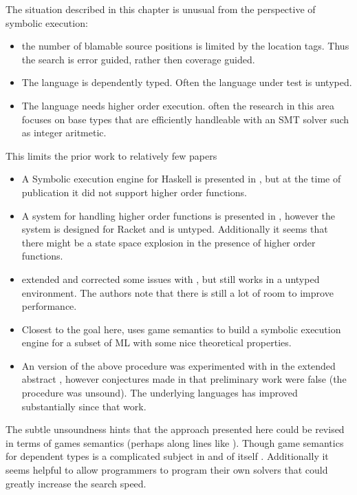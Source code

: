 The situation described in this chapter is unusual from the perspective
of symbolic execution:
\begin{itemize}
\item the number of blamable source positions is limited by the location
tags. Thus the search is error guided, rather then coverage guided.
\item The language is dependently typed. Often the language under test is
untyped.
\item The language needs higher order execution. often the research in this
area focuses on base types that are efficiently handleable with an
SMT solver such as integer aritmetic.
\end{itemize}
This limits the prior work to relatively few papers
\begin{itemize}
\item A Symbolic execution engine for Haskell is presented in \cite{10.1145/3314221.3314618},
but at the time of publication it did not support higher order functions.
\item A system for handling higher order functions is presented in \cite{nguyen2017higher},
however the system is designed for Racket and is untyped. Additionally
it seems that there might be a state space explosion in the presence
of higher order functions.
\item \cite{10.1007/978-3-030-72019-3_23} extended and corrected some issues
with \cite{nguyen2017higher}, but still works in a untyped environment.
The authors note that there is still a lot of room to improve performance.
\item Closest to the goal here, \cite{lin_et_al:LIPIcs:2020:12349} uses
game semantics to build a symbolic execution engine for a subset of
ML with some nice theoretical properties.
\item An version of the above procedure was experimented with in the extended
abstract , however conjectures made in that preliminary
work were false (the procedure was unsound). The underlying languages
has improved substantially since that work.
\end{itemize}
The subtle unsoundness hints that the approach presented here could
be revised in terms of games semantics (perhaps along lines like \cite{lin_et_al:LIPIcs:2020:12349}).
Though game semantics for dependent types is a complicated subject
in and of itself . Additionally it seems helpful to allow
programmers to program their own solvers that could greatly increase
the search speed.
